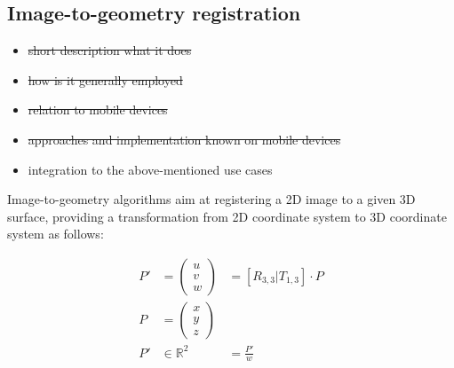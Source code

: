 \documentclass[review]{elsarticle}
\begin{document}


\subsection{Image-to-geometry registration}

\begin{itemize}
\item \sout{short description what it does}
\item \sout{how is it generally employed}
\item \sout{relation to mobile devices}
\item \sout{approaches and implementation known on mobile devices}
\item integration to the above-mentioned use cases
\end{itemize}

Image-to-geometry algorithms aim at registering a 2D image to a given 3D surface, providing a transformation from 2D coordinate system to 3D coordinate system as follows:

\begin{eqnarray}
P' &= \begin{pmatrix}
u \\ v \\ w
\end{pmatrix} &= [ R_{3,3} | T_{1,3} ] \cdot P \\
P &= \begin{pmatrix}
x \\ y \\ z
\end{pmatrix} & \\
P' &\in \mathds{R}^2 &= \frac{P'}{w}
\end{eqnarray}
\end{document}
